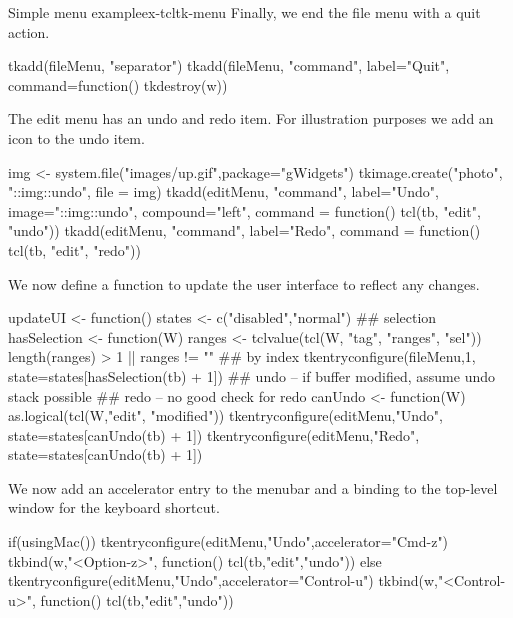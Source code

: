 \begin{example}{Simple menu example}{ex-tcltk-menu}
Finally, we end the file menu with a quit action. 
\begin{Schunk}
\begin{Sinput}
 tkadd(fileMenu, "separator")
 tkadd(fileMenu, "command", label="Quit", 
       command=function() tkdestroy(w))
\end{Sinput}
\end{Schunk}

The edit menu has an undo and redo item. For illustration purposes we add an icon to the undo item.
\begin{Schunk}
\begin{Sinput}
 img <- system.file("images/up.gif",package="gWidgets")
 tkimage.create("photo", "::img::undo", 
                      file = img)
 tkadd(editMenu, "command", label="Undo",
       image="::img::undo", compound="left",
       command = function() tcl(tb, "edit", "undo"))
 tkadd(editMenu, "command", label="Redo",
       command = function() tcl(tb, "edit", "redo"))
\end{Sinput}
\end{Schunk}

We now define a function to update the user interface to reflect any changes.
\begin{Schunk}
\begin{Sinput}
 updateUI <- function() {
   states <- c("disabled","normal")
   ## selection
   hasSelection <- function(W) {
     ranges <- tclvalue(tcl(W, "tag", "ranges", "sel"))
     length(ranges) > 1 || ranges != ""
   }
   ## by index  
   tkentryconfigure(fileMenu,1,  state=states[hasSelection(tb) + 1]) 
   ## undo -- if buffer modified, assume undo stack possible
   ## redo -- no good check for redo
   canUndo <- function(W) as.logical(tcl(W,"edit", "modified"))
   tkentryconfigure(editMenu,"Undo", state=states[canUndo(tb) + 1])
   tkentryconfigure(editMenu,"Redo", state=states[canUndo(tb) + 1])
 }
\end{Sinput}
\end{Schunk}

We now add an accelerator entry to the menubar and a binding to the top-level window for the keyboard shortcut.
\begin{Schunk}
\begin{Sinput}
 if(usingMac()) {
   tkentryconfigure(editMenu,"Undo",accelerator="Cmd-z")
   tkbind(w,"<Option-z>", function() tcl(tb,"edit","undo"))
 } else {
   tkentryconfigure(editMenu,"Undo",accelerator="Control-u")
   tkbind(w,"<Control-u>", function() tcl(tb,"edit","undo"))
 }
\end{Sinput}
\end{Schunk}


\end{example}
